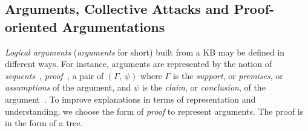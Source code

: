 \subsection{Arguments, Collective Attacks and Proof-oriented Argumentations}

 \textit{Logical arguments} (\textit{arguments} for short) built from a KB may be defined in different ways. For instance, arguments are represented by the notion of \emph{sequents}~\cite{ArieliS19}, \emph{proof}~\cite{SCHULZ_TONI_2016,Dung2009}, a pair of $(\Gamma,\ \psi)$ where $\Gamma$ is the
\textit{support}, or \textit{premises}, or \textit{assumptions} of the argument, and $\psi$ is the \textit{claim}, or \textit{conclusion}, of the argument~\cite{LoanHo2022,ARIOUA2017244}. To improve explanations in terms of representation and understanding, we choose the form of \emph{proof} to represent arguments. 
The proof is in the form of a tree.




